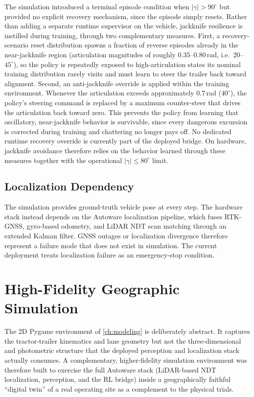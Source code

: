 The simulation introduced a terminal episode condition when $|\gamma| > 90^\circ$ but provided no explicit recovery mechanism, since the episode simply resets. Rather than adding a separate runtime supervisor on the vehicle, jackknife resilience is instilled during training, through two complementary measures. First, a recovery-scenario reset distribution spawns a fraction of reverse episodes already in the near-jackknife region (articulation magnitudes of roughly $0.35$--$0.80$\,rad, i.e.\ $20$--$45^\circ$), so the policy is repeatedly exposed to high-articulation states its nominal training distribution rarely visits and must learn to steer the trailer back toward alignment. Second, an anti-jackknife override is applied within the training environment. Whenever the articulation exceeds approximately $0.7$\,rad ($40^\circ$), the policy's steering command is replaced by a maximum counter-steer that drives the articulation back toward zero. This prevents the policy from learning that oscillatory, near-jackknife behavior is survivable, since every dangerous excursion is corrected during training and chattering no longer pays off. No dedicated runtime recovery override is currently part of the deployed bridge. On hardware, jackknife avoidance therefore relies on the behavior learned through these measures together with the operational $|\gamma| \le 80^\circ$ limit.

\subsection{Localization Dependency}

The simulation provides ground-truth vehicle pose at every step. The hardware stack instead depends on the Autoware localization pipeline, which fuses RTK-GNSS, gyro-based odometry, and LiDAR NDT scan matching through an extended Kalman filter. GNSS outages or localization divergence therefore represent a failure mode that does not exist in simulation. The current deployment treats localization failure as an emergency-stop condition.

\section{High-Fidelity Geographic Simulation}
\label{sec:geo_sim}

The 2D Pygame environment of \cref{ch:modeling} is deliberately abstract. It captures the tractor-trailer kinematics and lane geometry but not the three-dimensional and photometric structure that the deployed perception and localization stack actually consumes. A complementary, higher-fidelity simulation environment was therefore built to exercise the full Autoware stack (LiDAR-based NDT localization, perception, and the RL bridge) inside a geographically faithful ``digital twin'' of a real operating site as a complement to the physical trials.

